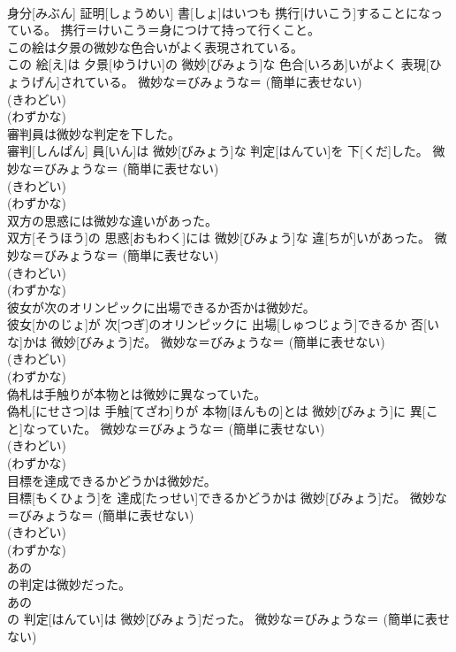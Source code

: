 \documentclass[8pt]{extreport}
\begin{document}
\begin{CJK}{UTF8}{min}
{\\	身分[みぶん] 証明[しょうめい] 書[しょ]はいつも 携行[けいこう]することになっている。	携行＝けいこう＝身につけて持って行くこと。
\\	この絵は夕景の微妙な色合いがよく表現されている。	
\\	この 絵[え]は 夕景[ゆうけい]の 微妙[びみょう]な 色合[いろあ]いがよく 表現[ひょうげん]されている。	微妙な＝びみょうな＝ (簡単に表せない) 
\\	(きわどい) 
\\	(わずかな) 
\\	審判員は微妙な判定を下した。	
\\	審判[しんぱん] 員[いん]は 微妙[びみょう]な 判定[はんてい]を 下[くだ]した。	微妙な＝びみょうな＝ (簡単に表せない) 
\\	(きわどい) 
\\	(わずかな) 
\\	双方の思惑には微妙な違いがあった。	
\\	双方[そうほう]の 思惑[おもわく]には 微妙[びみょう]な 違[ちが]いがあった。	微妙な＝びみょうな＝ (簡単に表せない) 
\\	(きわどい) 
\\	(わずかな) 
\\	彼女が次のオリンピックに出場できるか否かは微妙だ。	
\\	彼女[かのじょ]が 次[つぎ]のオリンピックに 出場[しゅつじょう]できるか 否[いな]かは 微妙[びみょう]だ。	微妙な＝びみょうな＝ (簡単に表せない) 
\\	(きわどい) 
\\	(わずかな) 
\\	偽札は手触りが本物とは微妙に異なっていた。	
\\	偽札[にせさつ]は 手触[てざわ]りが 本物[ほんもの]とは 微妙[びみょう]に 異[こと]なっていた。	微妙な＝びみょうな＝ (簡単に表せない) 
\\	(きわどい) 
\\	(わずかな) 
\\	目標を達成できるかどうかは微妙だ。	
\\	目標[もくひょう]を 達成[たっせい]できるかどうかは 微妙[びみょう]だ。	微妙な＝びみょうな＝ (簡単に表せない) 
\\	(きわどい) 
\\	(わずかな) 
\\	あの
\\	の判定は微妙だった。	
\\	あの 
\\	の 判定[はんてい]は 微妙[びみょう]だった。	微妙な＝びみょうな＝ (簡単に表せない) 
}
\end{CJK}
\end{document}
